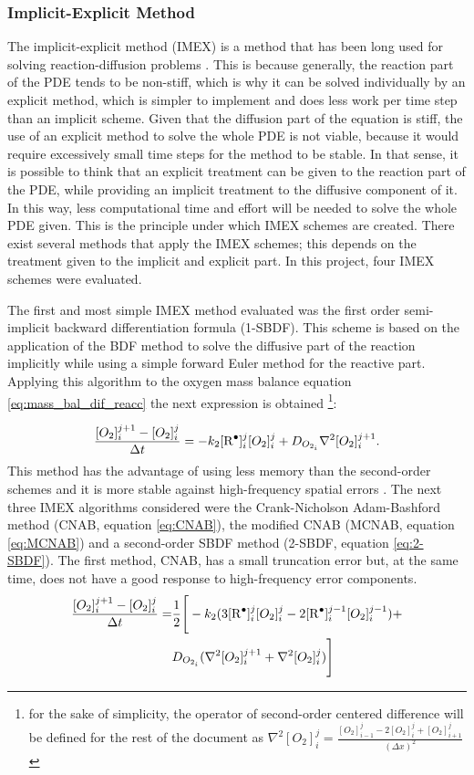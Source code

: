 \documentclass[twoside,11pt]{report}
\newcounter{reaction}
\begin{document}
\subsubsection{Implicit-Explicit Method}
The implicit-explicit method (IMEX) is a method that has been long used for solving reaction-diffusion problems \cite{LeVeque2007FiniteProblems}. This is because generally, the reaction part of the PDE tends to be non-stiff, which is why it can be solved individually by an explicit method, which is simpler to implement and does less work per time step than an implicit scheme. Given that the diffusion part of the equation is stiff, the use of an explicit method to solve the whole PDE is not viable, because it would require excessively small time steps for the method to be stable. In that sense, it is possible to think that an explicit treatment can be given to the reaction part of the PDE, while providing an implicit treatment to the diffusive component of it. In this way, less computational time and effort will be needed to solve the whole PDE given. This is the principle under which IMEX schemes are created. There exist several methods that apply the IMEX schemes; this depends on the treatment given to the implicit and explicit part. In this project, four IMEX schemes were evaluated.

The first and most simple IMEX method evaluated was the first order semi-implicit backward differentiation formula (1-SBDF). This scheme is based on the application of the BDF method to solve the diffusive part of the reaction implicitly while using a simple forward Euler method for the reactive part. Applying this algorithm to the oxygen mass balance equation \ref{eq:mass_bal_dif_reacc} the next expression is obtained \footnote{for the sake of simplicity, the operator of second-order centered difference will be defined for the rest of the document as $\nabla^2 [O_2]^j_i=\frac{[O_2]_{i-1}^{j}-2[O_2]_{i}^{j}+[O_2]_{i+1}^{j}}{(\Delta x)^2}$}:

\begin{equation}
   \frac{[O_2]^{j+1}_i-[O_2]^j_i}{\Delta t}=-k_2[\ce{R^.}]_i^{j}[O_2]_i^{j}+ D_{O_{2_i}}\nabla^2[O_2]_i^{j+1}.
\end{equation}
This method has the advantage of using less memory than the second-order schemes and it is more stable against high-frequency spatial errors \cite{Ruuth1995Implicit-explicitFormation}. The next three IMEX algorithms considered were the Crank-Nicholson Adam-Bashford method (CNAB, equation \ref{eq:CNAB}), the modified CNAB (MCNAB, equation \ref{eq:MCNAB}) and a second-order SBDF method (2-SBDF, equation \ref{eq:2-SBDF}). The first method, CNAB, has a small truncation error but, at the same time, does not have a good response to high-frequency error components.
    \begin{align}
    \frac{[O_2]^{j+1}_i-[O_2]^j_i}{\Delta t}=& \frac{1}{2}\Biggr[-k_2(3[\ce{R^.}]_i^{j}[O_2]_i^{j}-2[\ce{R^.}]_i^{j-1}[O_2]_i^{j-1})+\nonumber\\ &D_{O_{2_i}}(\nabla^2[O_2]_i^{j+1}+\nabla^2[O_2]_i^{j})\Biggr]
    \label{eq:CNAB}
    \end{align}
    
\end{document}
